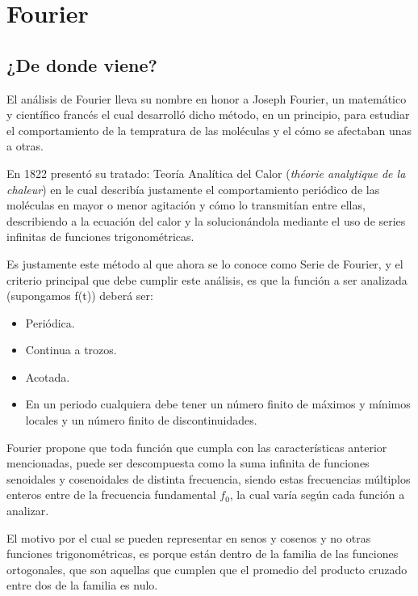 \documentclass[../main.tex]{subfiles}
\begin{document}
\graphicspath{{../imagenes/}}

\section{Fourier}

	\subsection{¿De donde viene?}
	El análisis de Fourier lleva su nombre en honor a Joseph Fourier, un
	matemático y científico francés el cual desarrolló dicho método, en un
	principio, para estudiar el comportamiento de la tempratura de las
	moléculas y el cómo se afectaban unas a otras.

	En 1822 presentó su tratado: Teoría Analítica del Calor (\emph{théorie
	analytique de la chaleur}) en le cual describía justamente el
	comportamiento periódico de las moléculas en mayor o menor agitación y
	cómo lo transmitían entre ellas, describiendo a la ecuación del calor y
	la solucionándola mediante el uso de series infinitas de funciones
	trigonométricas.

	Es justamente este método al que ahora se lo conoce como Serie de
	Fourier, y el criterio principal que debe cumplir este análisis, es que
	la función a ser analizada (supongamos f(t)) deberá ser:

	\begin{itemize}
		\item Periódica.

		\item Continua a trozos.

		\item Acotada.

		\item En un periodo cualquiera debe tener un número finito de máximos y
			mínimos locales y un número finito de discontinuidades.
	\end{itemize}

	Fourier propone que toda función que cumpla con las características
	anterior mencionadas, puede ser descompuesta como la suma infinita de
	funciones senoidales y cosenoidales de distinta frecuencia, siendo estas
	frecuencias múltiplos enteros entre de la frecuencia fundamental
	\(f_{0}\), la cual varía según cada función a analizar.

	El motivo por el cual se pueden representar en senos y cosenos y no
	otras funciones trigonométricas, es porque están dentro de la familia de
	las funciones ortogonales, que son aquellas que cumplen que el promedio
	del producto cruzado entre dos de la familia es nulo.
\end{document}
